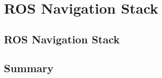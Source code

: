 \chapter{ROS Navigation Stack} \label{ch:BaseWork}




\section{ROS Navigation Stack}\label{ch:requirements}




\section{Summary}


